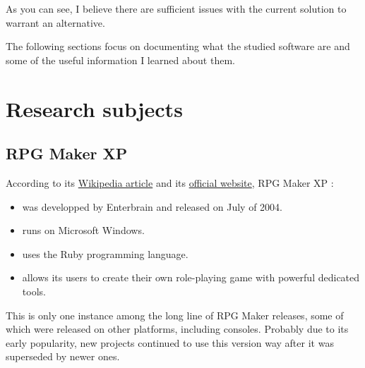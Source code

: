 \documentclass[11pt]{article}
\begin{document}
As you can see, I believe there are sufficient issues with the current solution to warrant an alternative.

The following sections focus on documenting what the studied software are and some of the useful information I learned about them.






\newpage

\section{Research subjects}
\subsection{RPG Maker XP}


According to its \href{https://en.wikipedia.org/wiki/RPG_Maker#RPG_Maker_series_timeline}{Wikipedia article} and its \href{https://www.rpgmakerweb.com/products/programs/rpg-maker-xp}{official website}, RPG Maker XP :
\begin{itemize}
	\item was developped by Enterbrain and released on July of 2004.
	
	\item runs on Microsoft Windows.
	
	\item uses the Ruby programming language.
	
	\item allows its users to create their own role-playing game with powerful dedicated tools.
\end{itemize}

This is only one instance among the long line of RPG Maker releases, some of which were released on other platforms, including consoles. Probably due to its early popularity, new projects continued to use this version way after it was superseded by newer ones.





\end{document}
